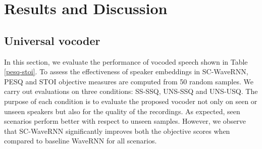 \documentclass[a4paper]{article}
\begin{document}
\section{Results and Discussion}
\subsection{Universal vocoder}
In this section, we evaluate the performance of vocoded speech shown in Table \ref{pesq-stoi}. To assess the effectiveness of speaker embeddings in SC-WaveRNN, PESQ and STOI objective measures are computed from 50 random samples. We carry out evaluations on three conditions: SS-SSQ, UNS-SSQ and UNS-USQ. The purpose of each condition is to evaluate the proposed vocoder not only on seen or unseen speakers but also for the quality of the recordings. As expected, seen scenarios perform better with respect to unseen samples. However, we observe that SC-WaveRNN significantly improves both the objective scores when compared to baseline WaveRNN for all scenarios.
\end{document}
